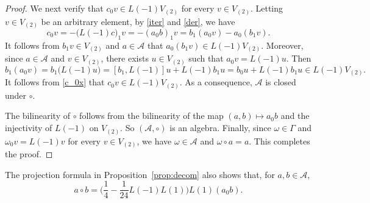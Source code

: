 \documentclass[12pt]{article}
\numberwithin{equation}{section}
\theoremstyle{definition}
\theoremstyle{plain}
\newcommand{\cA}{\ensuremath{\mathcal{A}}}
\begin{document}
\begin{proof}
    We next verify that $c_0v\in L(-1)V_{(2)}$ for every $v\in V_{(2)}$. Letting $v\in V_{(2)}$ be an arbitrary element, by \eqref{iter} and \eqref{der}, we have
    \begin{equation}\label{c_0x}
        c_0v=-\big(L(-1)c\big)_1v=-(a_0b)_1v=b_1(a_0v)-a_0(b_1v).
    \end{equation}
    It follows from $b_1v\in V_{(2)}$ and $a\in\cA$ that $a_0(b_1v)\in L(-1)V_{(2)}$. Moreover, since $a\in \cA$ and $v\in V_{(2)}$, there exists $u\in V_{(2)}$ such that $a_0v=L(-1)u$. Then
    \begin{equation*}
        b_1(a_0v)=b_1\big(L(-1)u\big)=[b_1,L(-1)]u+L(-1)b_1u=b_0u+L(-1)b_1u\in L(-1)V_{(2)}.
    \end{equation*}
    It follows from \eqref{c_0x} that $c_0v\in L(-1)V_{(2)}$. As a consequence, $\cA$ is closed under $\circ$.

    The bilinearity of $\circ$ follows from the bilinearity of the map $(a,b)\mapsto a_0b$ and the injectivity of $L(-1)$ on $V_{(2)}$. So $(\cA,\circ)$ is an algebra. Finally, since $\omega\in\Gamma$ and $\omega_0v=L(-1)v$ for every $v\in V_{(2)}$, we have $\omega\in\cA$ and $\omega\circ a=a$. This completes the proof.
\end{proof}

The projection formula in Proposition~\ref{prop:decom} also shows that, for $a,b\in\cA$,
    \begin{equation}\label{c^ab}
        a\circ b=\Big(\frac{1}{4}-\frac{1}{24}L(-1)L(1)\Big)L(1)(a_0b).
    \end{equation}
\end{document}
